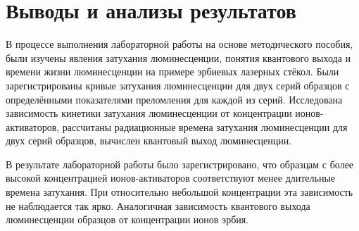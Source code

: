 \section{Выводы и анализы результатов}\label{sec:conclution}

В процессе выполнения лабораторной работы на основе методического пособия\cite{AseevMetoda}, были изучены явления затухания люминесценции,
понятия квантового выхода и времени жизни люминесценции на примере эрбиевых лазерных стёкол.
Были зарегистрированы кривые затухания люминесценции для двух серий образцов с определёнными показателями преломления для каждой из серий.
Исследована зависимость кинетики затухания люминесценции от концентрации ионов-активаторов,
рассчитаны радиационные времена затухания люминесценции для двух серий образцов, вычислен квантовый выход люминесценции.

В результате лабораторной работы было зарегистрировано,
что образцам с более высокой концентрацией ионов-активаторов соответствуют менее длительные времена затухания.
При относительно небольшой концентрации эта зависимость не наблюдается так ярко.
Аналогичная зависимость квантового выхода люминесценции образцов от концентрации ионов эрбия.

